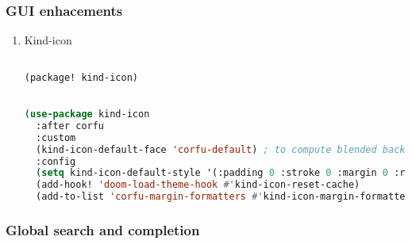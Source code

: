 \documentclass[11pt]{article}
\begin{document}
\subsubsection{GUI enhacements}
\label{sec:gui-enhacements}


\begin{enumerate}
  \item Kind-icon
  \label{sec:kind-icon}

  \begin{lstlisting}[language=Lisp]%! Someone please complete this list for me

(package! kind-icon)
\end{lstlisting}

\begin{lstlisting}[language=Lisp]%! Someone please complete this list for me

(use-package kind-icon
  :after corfu
  :custom
  (kind-icon-default-face 'corfu-default) ; to compute blended backgrounds correctly
  :config
  (setq kind-icon-default-style '(:padding 0 :stroke 0 :margin 0 :radius 0 :height 0.8 :scale 1.0))
  (add-hook! 'doom-load-theme-hook #'kind-icon-reset-cache)
  (add-to-list 'corfu-margin-formatters #'kind-icon-margin-formatter))
\end{lstlisting}
\end{enumerate}

\subsubsection{Global search and completion}
\label{sec:global-search-and-completion}
\end{document}
